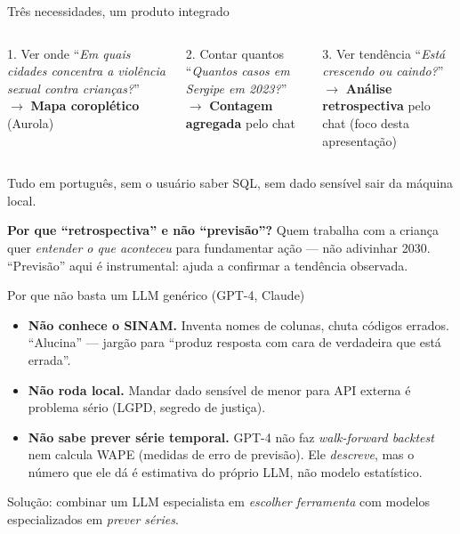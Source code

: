 \documentclass[10pt,aspectratio=169]{beamer}
\begin{document}
\begin{frame}{Três necessidades, um produto integrado}
\begin{columns}[T,onlytextwidth]
\begin{block}{1. Ver onde}
``\emph{Em quais cidades concentra a violência sexual contra
crianças?}''\\[0.2em]
$\to$ \textbf{Mapa coroplético} (Aurola)
\end{block}
\begin{block}{2. Contar quantos}
``\emph{Quantos casos em Sergipe em 2023?}''\\[0.2em]
$\to$ \textbf{Contagem agregada} pelo chat
\end{block}
\begin{block}{3. Ver tendência}
``\emph{Está crescendo ou caindo?}''\\[0.2em]
$\to$ \textbf{Análise retrospectiva} pelo chat (foco desta apresentação)
\end{block}
\end{columns}

\vspace{0.8em}
\alert{Tudo em português, sem o usuário saber SQL, sem dado sensível
sair da máquina local.}

\vspace{0.3em}
\footnotesize
\textbf{Por que ``retrospectiva'' e não ``previsão''?} Quem trabalha
com a criança quer \emph{entender o que aconteceu} para fundamentar
ação --- não adivinhar 2030. ``Previsão'' aqui é instrumental: ajuda
a confirmar a tendência observada.
\end{frame}

\begin{frame}{Por que não basta um LLM genérico (GPT-4, Claude)}
\begin{itemize}\setlength\itemsep{0.3em}
\item \textbf{Não conhece o SINAM.} Inventa nomes de colunas, chuta
códigos errados. ``Alucina'' --- jargão para ``produz resposta com
cara de verdadeira que está errada''.

\item \textbf{Não roda local.} Mandar dado sensível de menor para
API externa é problema sério (LGPD, segredo de justiça).

\item \textbf{Não sabe prever série temporal.} GPT-4 não faz
\emph{walk-forward backtest} nem calcula WAPE (medidas de erro de
previsão). Ele \emph{descreve}, mas o número que ele dá é estimativa
do próprio LLM, não modelo estatístico.
\end{itemize}

\vspace{0.4em}
\alert{Solução: combinar um LLM especialista em \emph{escolher
ferramenta} com modelos especializados em \emph{prever séries}.}
\end{frame}
\end{document}
